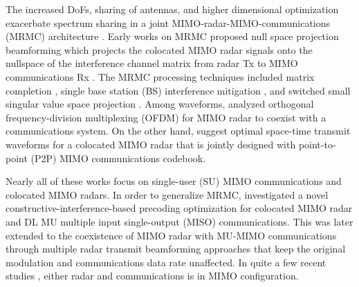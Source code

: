\documentclass[10pt,journal]{IEEEtran}
\theoremstyle{definition}
\begin{document}
The increased DoFs, sharing of antennas, and higher dimensional optimization exacerbate spectrum sharing in a joint MIMO-radar-MIMO-communications (MRMC) architecture \cite{alaee2020information,dokhanchi2020multi}. %
Early works on MRMC proposed null space projection beamforming which projects the colocated MIMO radar signals onto the nullspace of the interference channel matrix from radar Tx to MIMO communications Rx \cite{khawar2015target}. The MRMC processing techniques included matrix completion %
\cite{MCMIMO_RadComm}, single base station (BS) interference mitigation \cite{khawar2015target}, and switched small singular value space projection %
\cite{mahal2017spectral}. %
Among waveforms, \cite{bao2019precoding} analyzed orthogonal frequency-division multiplexing (OFDM) for MIMO radar to coexist with a communications system. On the other hand, \cite{qian2018joint,rihan2018optimum} suggest optimal space-time transmit waveforms for a colocated MIMO radar that is jointly designed with point-to-point (P2P) MIMO communications codebook.
	
	Nearly all of these works focus on single-user (SU) MIMO communications and colocated MIMO radars. In order to generalize MRMC, \cite{liu2018mimo} investigated a novel constructive-interference-based precoding optimization for colocated MIMO radar and DL MU multiple input single-output (MISO) communications. This was later extended to the coexistence of MIMO radar with MU-MIMO communications \cite{liu2018mu} through multiple radar transmit beamforming approaches that keep the original modulation and communications data rate unaffected. In quite a few recent studies \cite{Lops2020uplink,Lops2019serveillance}, either radar and communications is in MIMO configuration. %
	
\end{document}
